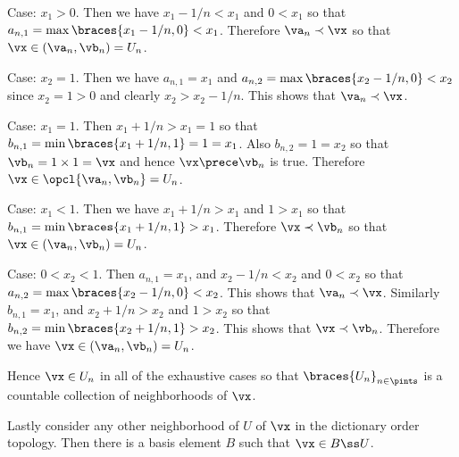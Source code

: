 {{\begin{indpar}
      Case: $x_1 > 0$.
      Then we have $x_1-1/n < x_1$ and $0 < x_1$ so that $a_{n,1} = \max\braces{x_1-1/n,0} < x_1$.
      Therefore $\va_n \prec \vx$ so that $\vx \in (\va_n, \vb_n) = U_n$.
    \end{indpar}

    Case: $x_2 = 1$.
    Then we have $a_{n,1} = x_1$ and $a_{n,2} = \max\braces{x_2-1/n,0} < x_2$ since $x_2 = 1 > 0$ and clearly $x_2 > x_2-1/n$.
    This shows that $\va_n \prec \vx$.
    \begin{indpar}
      Case: $x_1 = 1$.
      Then $x_1+1/n > x_1 = 1$ so that $b_{n,1} = \min\braces{x_1+1/n,1} = 1 = x_1$.
      Also $b_{n,2} = 1 = x_2$ so that $\vb_n = 1 \times 1 = \vx$ and hence $\vx \prece \vb_n$ is true.
      Therefore $\vx \in \opcl{\va_n, \vb_n} = U_n$.

      Case: $x_1 < 1$.
      Then we have $x_1+1/n > x_1$ and $1 > x_1$ so that $b_{n,1} = \min\braces{x_1+1/n,1} > x_1$.
      Therefore $\vx \prec \vb_n$ so that $\vx \in (\va_n, \vb_n) = U_n$.
    \end{indpar}

    Case: $0 < x_2 < 1$.
    Then $a_{n,1} = x_1$, and $x_2-1/n < x_2$ and $0 < x_2$ so that $a_{n,2} = \max\braces{x_2-1/n,0} < x_2$.
    This shows that $\va_n \prec \vx$.
    Similarly $b_{n,1} = x_1$, and $x_2+1/n > x_2$ and $1 > x_2$ so that $b_{n,2} = \min\braces{x_2+1/n,1} > x_2$.
    This shows that $\vx \prec \vb_n$.
    Therefore we have $\vx \in (\va_n,\vb_n) = U_n$.
    
    Hence $\vx \in U_n$ in all of the exhaustive cases so that $\braces{U_n}_{n \in \pints}$ is a countable collection of neighborhoods of $\vx$.

    Lastly consider any other neighborhood of $U$ of $\vx$ in the dictionary order topology.
    Then there is a basis element $B$ such that $\vx \in B \ss U$.
  }
}
